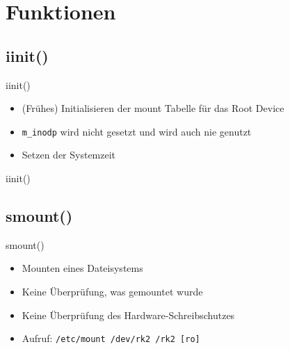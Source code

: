 \documentclass{beamer}
\begin{document}


\section{Funktionen}

\begin{frame}[plain]
    \sectionpage
\end{frame}




\subsection{iinit()}

\begin{frame}{iinit()}
    \begin{itemize}
        \item (Frühes) Initialisieren der mount Tabelle für das Root Device
        \item \texttt{m\_inodp} wird nicht gesetzt und wird auch nie genutzt
        \item Setzen der Systemzeit
    \end{itemize}
\end{frame}


\begin{frame}{iinit()}
\end{frame}




\subsection{smount()}

\begin{frame}{smount()}
    \begin{itemize}
        \item Mounten eines Dateisystems
        \item Keine Überprüfung, was gemountet wurde
        \item Keine Überprüfung des Hardware-Schreibschutzes
        \item Aufruf: \texttt{/etc/mount /dev/rk2 /rk2 [ro]}
    \end{itemize}
\end{frame}
\end{document}
